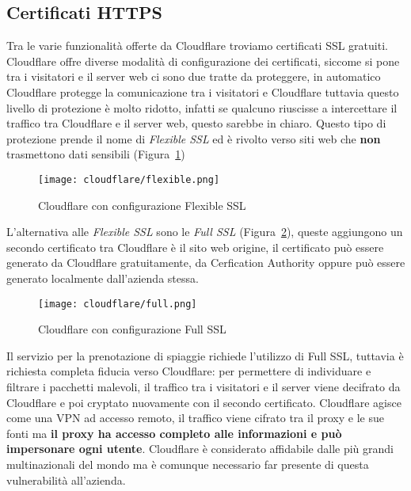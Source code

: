 \subsection{Certificati HTTPS}%
\label{sub:certificati}

Tra le varie funzionalit\`a offerte da Cloudflare troviamo certificati SSL gratuiti. Cloudflare offre diverse modalit\`a di configurazione dei certificati, siccome si pone tra i visitatori e il server web ci sono due tratte da proteggere, in automatico Cloudflare protegge la comunicazione tra i visitatori e Cloudflare tuttavia questo livello di protezione \`e molto ridotto, infatti se qualcuno riuscisse a intercettare il traffico tra Cloudflare e il server web, questo sarebbe in chiaro. Questo tipo di protezione prende il nome di \emph{Flexible SSL} ed \`e rivolto verso siti web che \textbf{non} trasmettono dati sensibili (Figura~\ref{fig:flexiblessl}) %

\begin{figure}[htpb]
    \centering
    \texttt{[image: cloudflare/flexible.png]}
    \caption{Cloudflare con configurazione Flexible SSL}%
    \label{fig:flexiblessl}
\end{figure}

L'alternativa alle \emph{Flexible SSL} sono le \emph{Full SSL} (Figura~\ref{fig:fullssl}), queste aggiungono un secondo certificato tra Cloudflare \`e il sito web origine, il certificato pu\`o essere generato da Cloudflare gratuitamente, da Cerfication Authority oppure pu\`o essere generato localmente dall'azienda stessa. %

\begin{figure}[htpb]
    \centering
    \texttt{[image: cloudflare/full.png]}
    \caption{Cloudflare con configurazione Full SSL}%
    \label{fig:fullssl}
\end{figure}

Il servizio per la prenotazione di spiaggie richiede l'utilizzo di Full SSL, tuttavia \`e richiesta completa fiducia verso Cloudflare: per permettere di individuare e filtrare i pacchetti malevoli, il traffico tra i visitatori e il server viene decifrato da Cloudflare e poi cryptato nuovamente con il secondo certificato. Cloudflare agisce come una VPN ad accesso remoto, il traffico viene cifrato tra il proxy e le sue fonti ma \textbf{il proxy ha accesso completo alle informazioni e pu\`o impersonare ogni utente}. Cloudflare \`e considerato affidabile dalle pi\`u grandi multinazionali del mondo ma \`e comunque necessario far presente di questa vulnerabilit\`a all'azienda. 